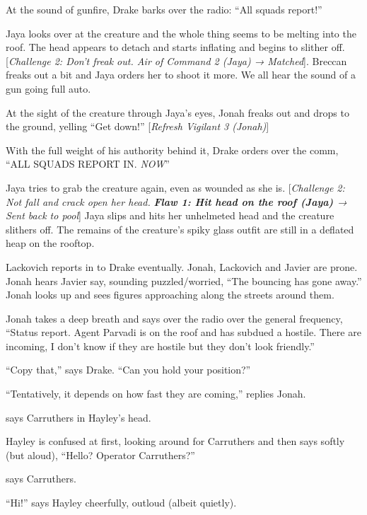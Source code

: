 At the sound of gunfire, Drake barks over the radio: ``All squads report!''

Jaya looks over at the creature and the whole thing seems to be melting into the roof.  The head appears to detach and starts inflating and begins to slither off.  {[}\textit{Challenge 2: Don't freak out. Air of Command 2 (Jaya) → Matched}{]}.   Breccan freaks out a bit and Jaya orders her to shoot it more.  We all hear the sound of a gun going full auto.

At the sight of the creature through Jaya's eyes, Jonah freaks out and drops to the ground, yelling ``Get down!''  {[}\textit{Refresh Vigilant 3 (Jonah)}{]}



With the full weight of his authority behind it, Drake orders over the comm, ``ALL SQUADS REPORT IN.  \textit{NOW}''



Jaya tries to grab the creature again, even as wounded as she is.  {[}\textit{Challenge 2: Not fall and crack open her head.  }\textit{\textbf{ {\color[RGB]{255,0,0}Flaw 1: Hit head on the roof (Jaya) } }}\textit{→ Sent back to pool}{]}  Jaya slips and hits her unhelmeted head and the creature slithers off.  The remains of the creature's spiky glass outfit are still in a deflated heap on the rooftop.



Lackovich reports in to Drake eventually.  Jonah, Lackovich and Javier are prone.  Jonah hears Javier say, sounding puzzled/worried, ``The bouncing has gone away.''  Jonah looks up and sees figures approaching along the streets around them.

Jonah takes a deep breath and says over the radio over the general frequency, ``Status report. Agent Parvadi is on the roof and has subdued a hostile.  There are incoming, I don't know if they are hostile but they don't look friendly.''

``Copy that,'' says Drake.  ``Can you hold your position?''

``Tentatively, it depends on how fast they are coming,'' replies Jonah.



 says Carruthers in Hayley's head.

Hayley is confused at first, looking around for Carruthers and then says softly (but aloud), ``Hello?  Operator Carruthers?''

 says Carruthers.

``Hi!'' says Hayley cheerfully, outloud (albeit quietly).

